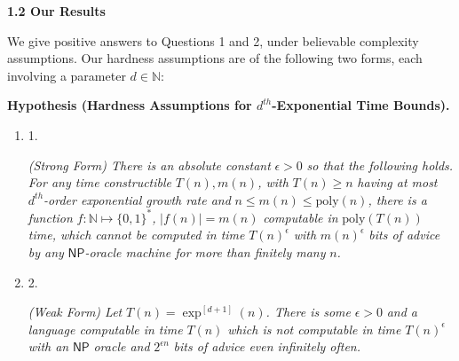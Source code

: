 \documentclass[10pt,a4paper]{article}
\begin{document}
\par\medskip\noindent\textbf{
1.2 Our Results}\par




We give positive answers to Questions 1 and 2, under believable complexity assumptions. Our hardness assumptions are of the following two forms, each involving a parameter $d\in\mathbb{N}$:\par





\par\medskip\noindent\textbf{
\textbf{Hypothesis}\textbf{ }(Hardness Assumptions for $d^{th}$-Exponential Time Bounds)\textbf{.}
}\par



\begin{enumerate}


\item[] 
1. 


\emph{(Strong Form) There is an absolute constant }$\epsilon>0$\emph{ so that the following holds. For any time constructible }$T(n),m(n)$\emph{, with }$T(n)\geq n$\emph{ having at most }$d^{th}$\emph{-order exponential growth rate and }$n\leq m(n)\leq\mathrm{poly}(n)$\emph{, there is a function }$f:\mathbb{N}\mapsto\{0,1\}^{*}$\emph{, }$|f(n)|=m(n)$\emph{ computable in }$\mathrm{poly}(T(n))$\emph{ time, which cannot be computed in time }$T(n)^{\epsilon}$\emph{ with }$m(n)^{\epsilon}$\emph{ bits of advice by any }${\mathsf{NP}}$\emph{-oracle machine for more than finitely many }$n$\emph{.}\par





\item[] 
2. 


\emph{(Weak Form) Let }$T(n)=\exp^{[d+1]}(n)$\emph{. There is some }$\epsilon>0$\emph{ and a language computable in time }$T(n)$\emph{ which is not computable in time }$T(n)^{\epsilon}$\emph{ with an }${\mathsf{NP}}$\emph{ oracle and }$2^{\epsilon n}$\emph{ bits of advice even infinitely often.}\par





\end{enumerate}



\end{document}
